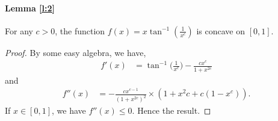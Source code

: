 \documentclass{article}
\newcommand{\bp}{\boldsymbol{p}}
\newtheorem{prop}{Property}
\begin{document}
\paragraph{Lemma \ref{l:2}}
For any $c>0$, the function $f(x)=x \tan^{-1}(\frac{1}{x^c})$ is concave on $[0,1]$. 
\begin{proof}
By some easy algebra, we have, 
\begin{align*}
    f'(x) & = \tan^{-1}\bigg(\frac{1}{x^c}\bigg)-\frac{c x^c}{1+x^{2c}}
\end{align*}
and
\begin{align*}
    f''(x) & = - \frac{c x^{c-1}}{(1+x^{2c})^2} \times (1+x^2c+c(1-x^c)).
\end{align*}
If $x \in [0,1]$, we have $f''(x) \leq 0$. Hence the result.
\end{proof}

\end{document}
